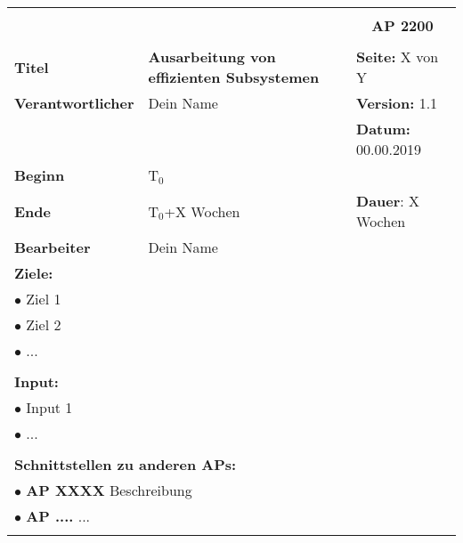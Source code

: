 \clearpage
\begin{table}[!h]
 \begin{center}
  \begin{tabular}{|p{35mm}||p{55mm}|p{50mm}||p{40mm}|}
   \hline
   \multicolumn{3}{|l||}{\textbf{}} & \multicolumn{1}{c|}{}\\
   \multicolumn{3}{|l||}{\textbf{}} & \multicolumn{1}{c|}{\textbf{AP 2200}}\\
   \multicolumn{3}{|l||}{\textbf{}} & \multicolumn{1}{c|}{}\\
   \hline\hline
   \textbf{Titel} & \multicolumn{2}{p{7cm}||}{\textbf{Ausarbeitung von effizienten Subsystemen}} & \textbf{Seite:} X von Y\\
   \hline
   \textbf{Verantwortlicher} & \multicolumn{2}{l||}{Dein Name} & \textbf{Version:} 1.1\\
   \hline
   \multicolumn{3}{|l||}{} & \textbf{Datum:} 00.00.2019\\
   \hline\hline
   \textbf{Beginn} & \multicolumn{2}{l||}{T$_0$} & \\
   \hline
   \textbf{Ende} & \multicolumn{2}{l||}{T$_0$+X Wochen} & \textbf{Dauer}: X Wochen\\
   \hline\hline
   \textbf{Bearbeiter} & \multicolumn{3}{l|}{Dein Name}\\
   \hline\hline
   \multicolumn{4}{|p{150mm}|}{\textbf{Ziele:}}\\
   \multicolumn{4}{|p{150mm}|}{$\bullet$ Ziel 1}\\
   \multicolumn{4}{|p{150mm}|}{$\bullet$ Ziel 2}\\
   \multicolumn{4}{|p{150mm}|}{$\bullet$ ...}\\
   \multicolumn{4}{|p{150mm}|}{}\\
   \multicolumn{4}{|p{150mm}|}{\textbf{Input:}}\\
   \multicolumn{4}{|p{150mm}|}{$\bullet$ Input 1}\\
   \multicolumn{4}{|p{150mm}|}{$\bullet$ ...}\\
   \multicolumn{4}{|p{150mm}|}{}\\
   \multicolumn{4}{|p{150mm}|}{\textbf{Schnittstellen zu anderen APs:}}\\
   \multicolumn{4}{|p{150mm}|}{$\bullet$ \textbf{AP XXXX} Beschreibung}\\
   \multicolumn{4}{|p{150mm}|}{$\bullet$ \textbf{AP ....} ...}\\
   \multicolumn{4}{|p{150mm}|}{}\\

\end{tabular}
\end{center}
\end{table}
